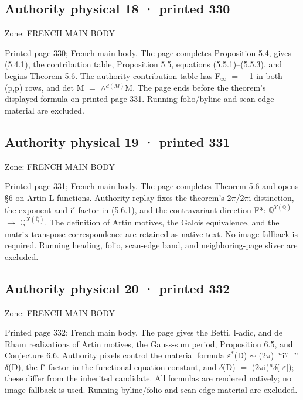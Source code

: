 \documentclass[10pt,twoside]{article}
\begin{document}
\subsection*{Authority physical 18 · printed 330}
\noindent\textsf{Zone: FRENCH MAIN BODY}\par
Printed page 330; French main body. The page completes Proposition 5.4, gives (5.4.1), the contribution table, Proposition 5.5, equations (5.5.1)–(5.5.3), and begins Theorem 5.6. The authority contribution table has F\ensuremath{_{∞}} \ensuremath{=} \ensuremath{−}1 in both (p,p) rows, and det M \ensuremath{=} \ensuremath{∧}\ensuremath{^{d(M)}}M. The page ends before the theorem’s displayed formula on printed page 331. Running folio/byline and scan-edge material are excluded.\par
\subsection*{Authority physical 19 · printed 331}
\noindent\textsf{Zone: FRENCH MAIN BODY}\par
Printed page 331; French main body. The page completes Theorem 5.6 and opens \S{}6 on Artin L-functions. Authority replay fixes the theorem’s 2\ensuremath{π}/2\ensuremath{π}i distinction, the exponent and i\ensuremath{^{ε}} factor in (5.6.1), and the contravariant direction F*: \ensuremath{ℚ}\ensuremath{^{Y(\bar{ℚ})}} \ensuremath{→} \ensuremath{ℚ}\ensuremath{^{X(\bar{ℚ})}}. The definition of Artin motives, the Galois equivalence, and the matrix-transpose correspondence are retained as native text. No image fallback is required. Running heading, folio, scan-edge band, and neighboring-page sliver are excluded.\par
\subsection*{Authority physical 20 · printed 332}
\noindent\textsf{Zone: FRENCH MAIN BODY}\par
Printed page 332; French main body. The page gives the Betti, l-adic, and de Rham realizations of Artin motives, the Gauss-sum period, Proposition 6.5, and Conjecture 6.6. Authority pixels control the material formula \ensuremath{ε}\ensuremath{^{*}}(D) \ensuremath{∼} (2\ensuremath{π})\ensuremath{^{-n}}i\ensuremath{^{η−n}}\ensuremath{δ}(D), the f\ensuremath{^{s}} factor in the functional-equation constant, and \ensuremath{δ}(D) \ensuremath{=} (2\ensuremath{π}i)\ensuremath{^{n}}\ensuremath{δ}([\ensuremath{ε}]); these differ from the inherited candidate. All formulas are rendered natively; no image fallback is used. Running byline/folio and scan-edge material are excluded.\par
\end{document}
